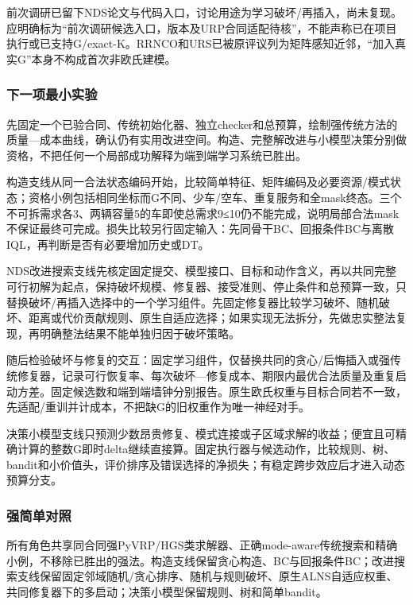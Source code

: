 \documentclass[11pt,a4paper]{article}
\newcommand{\bodytext}[1]{#1\par}
\begin{document}
\bodytext{前次调研已留下NDS论文与代码入口，讨论用途为学习破坏/\allowbreak{}再插入，尚未复现。应明确标为“前次调研候选入口，版本及URP合同适配待核”，不能声称已在项目执行或已支持G/\allowbreak{}exact-K。RRNCO和URS已被原评议列为矩阵感知近邻，“加入真实G”本身不构成首次非欧氏建模。}
\subsubsection{下一项最小实验}
\bodytext{先固定一个已验合同、传统初始化器、独立checker和总预算，绘制强传统方法的质量—成本曲线，确认仍有实用改进空间。构造、完整解改进与小模型决策分别做资格，不把任何一个局部成功解释为端到端学习系统已胜出。}
\bodytext{构造支线从同一合法状态编码开始，比较简单特征、矩阵编码及必要资源/\allowbreak{}模式状态；资格小例包括相同坐标而G不同、少车/\allowbreak{}空车、重复服务和全mask终态。三个不可拆需求各3、两辆容量5的车即使总需求9≤10仍不能完成，说明局部合法mask不保证最终可完成。损失比较另行固定输入：先同骨干BC、回报条件BC与离散IQL，再判断是否有必要增加历史或DT。}
\bodytext{NDS改进搜索支线先核定固定提交、模型接口、目标和动作含义，再以共同完整可行初解为起点，保持破坏规模、修复器、接受准则、停止条件和总预算一致，只替换破坏/\allowbreak{}再插入选择中的一个学习组件。先固定修复器比较学习破坏、随机破坏、距离或代价贡献规则、原生自适应选择；如果实现无法拆分，先做忠实整法复现，再明确整法结果不能单独归因于破坏策略。}
\bodytext{随后检验破坏与修复的交互：固定学习组件，仅替换共同的贪心/\allowbreak{}后悔插入或强传统修复器，记录可行恢复率、每次破坏—修复成本、期限内最优合法质量及重复启动方差。固定候选数和端到端墙钟分别报告。原生欧氏权重与目标合同若不一致，先适配/\allowbreak{}重训并计成本，不把缺G的旧权重作为唯一神经对手。}
\bodytext{决策小模型支线只预测少数昂贵修复、模式连接或子区域求解的收益；便宜且可精确计算的整数G即时delta继续直接算。固定执行器与候选动作，比较规则、树、bandit和小价值头，评价排序及错误选择的净损失；有稳定跨步效应后才进入动态预算分支。}
\subsubsection{强简单对照}
\bodytext{所有角色共享同合同强PyVRP/\allowbreak{}HGS类求解器、正确mode-aware传统搜索和精确小例，不移除已胜出的强法。构造支线保留贪心构造、BC与回报条件BC；改进搜索支线保留固定邻域随机/\allowbreak{}贪心排序、随机与规则破坏、原生ALNS自适应权重、共同修复器下的多启动；决策小模型保留规则、树和简单bandit。}
\end{document}
